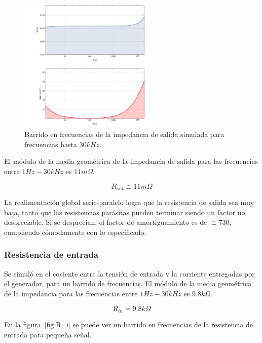 \documentclass[a4paper,12pt,twoside]{article}
\begin{document}
\begin{figure}[H]
	\centering
	\includegraphics[width=0.6\textwidth]{img/sim/R_out-zoom}
	\caption{Barrido en frecuencias de la impedancia de salida simulada para frecuencias hasta $30kHz$.}
	\label{fig:R_out-zoom}
\end{figure}

El módulo de la media geométrica de la impedancia de salida para las frecuencias entre $1Hz-30kHz$ es $11m\Omega$.

\[R_{out}\cong 11m\Omega\]

La realimentación global serie-paralelo logra que la resistencia de salida sea muy baja, tanto que las resistencias parásitas pueden terminar siendo un factor no despreciable. Si se desprecian, el factor de amortiguamiento es de $\cong 730$, cumpliendo cómodamente con lo especificado.


\subsubsection{Resistencia de entrada}

Se simuló en el cociente entre la tensión de entrada y la corriente entregadas por el generador, para un barrido de frecuencias. El módulo de la media geométrica de la impedancia para las frecuencias entre $1Hz-30kHz$ es $9.8k\Omega$.

\[R_{in}=9.8k\Omega\]

En la figura~\ref{fig:R_i} se puede ver un barrido en frecuencias de la resistencia de entrada para pequeña señal.
\end{document}
